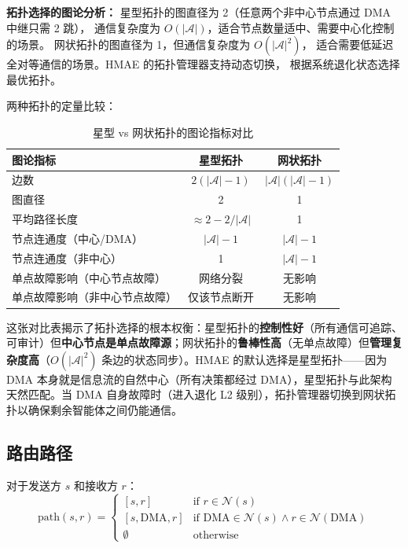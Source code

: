 \documentclass[11pt,a4paper]{ctexart}
\theoremstyle{remark}
\begin{document}
\textbf{拓扑选择的图论分析：} 星型拓扑的图直径为 2（任意两个非中心节点通过 DMA 中继只需 2 跳），
通信复杂度为 $O(|\mathcal{A}|)$，适合节点数量适中、需要中心化控制的场景。
网状拓扑的图直径为 1，但通信复杂度为 $O(|\mathcal{A}|^2)$，
适合需要低延迟全对等通信的场景。HMAE 的拓扑管理器支持动态切换，
根据系统退化状态选择最优拓扑。

两种拓扑的定量比较：
\begin{table}[H]
\centering
\small
\begin{tabular}{lcc}
\toprule
\textbf{图论指标} & \textbf{星型拓扑} & \textbf{网状拓扑} \\
\midrule
边数 & $2(|\mathcal{A}|-1)$ & $|\mathcal{A}|(|\mathcal{A}|-1)$ \\
图直径 & 2 & 1 \\
平均路径长度 & $\approx 2 - 2/|\mathcal{A}|$ & 1 \\
节点连通度（中心/DMA） & $|\mathcal{A}|-1$ & $|\mathcal{A}|-1$ \\
节点连通度（非中心） & 1 & $|\mathcal{A}|-1$ \\
单点故障影响（中心节点故障） & 网络分裂 & 无影响 \\
单点故障影响（非中心节点故障） & 仅该节点断开 & 无影响 \\
\bottomrule
\end{tabular}
\caption{星型 vs 网状拓扑的图论指标对比}
\end{table}

这张对比表揭示了拓扑选择的根本权衡：星型拓扑的\textbf{控制性好}（所有通信可追踪、可审计）但\textbf{中心节点是单点故障源}；网状拓扑的\textbf{鲁棒性高}（无单点故障）但\textbf{管理复杂度高}（$O(|\mathcal{A}|^2)$ 条边的状态同步）。HMAE 的默认选择是星型拓扑——因为 DMA 本身就是信息流的自然中心（所有决策都经过 DMA），星型拓扑与此架构天然匹配。当 DMA 自身故障时（进入退化 L2 级别），拓扑管理器切换到网状拓扑以确保剩余智能体之间仍能通信。

\subsection{路由路径}

对于发送方 $s$ 和接收方 $r$：
\begin{equation}
\text{path}(s, r) =
\begin{cases}
[s, r] & \text{if } r \in \mathcal{N}(s) \\
[s, \text{DMA}, r] & \text{if } \text{DMA} \in \mathcal{N}(s) \land r \in \mathcal{N}(\text{DMA}) \\
\emptyset & \text{otherwise}
\end{cases}
\end{equation}
\end{document}
